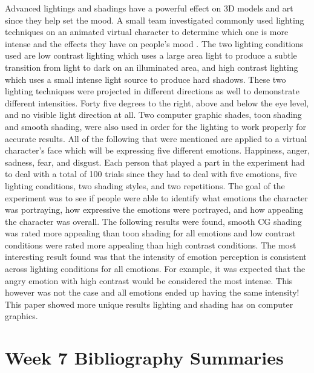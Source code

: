 \documentclass{article}
\begin{document}
Advanced lightings and shadings have a powerful effect on 3D models and art since they help set the mood. A small team investigated commonly used lighting techniques on an animated virtual character to determine which one is more intense and the effects they have on people's mood \cite{10.1145/2931002.2931015}. The two lighting conditions used are low contrast lighting which uses a large area light to produce a subtle transition from light to dark on an illuminated area, and high contrast lighting which uses a small intense light source to produce hard shadows. These two lighting techniques were projected in different directions as well to demonstrate different intensities. Forty five degrees to the right, above and below the eye level, and no visible light direction at all. Two computer graphic shades, toon shading and smooth shading, were also used in order for the lighting to work properly for accurate results. All of the following that were mentioned are applied to a virtual character’s face which will be expressing five different emotions. Happiness, anger, sadness, fear, and disgust. Each person that played a part in the experiment had to deal with a total of 100 trials since they had to deal with five emotions, five lighting conditions, two shading styles, and two repetitions. The goal of the experiment was to see if people were able to identify what emotions the character was portraying, how expressive the emotions were portrayed, and how appealing the character was overall. The following results were found, smooth CG shading was rated more appealing than toon shading for all emotions and low contrast conditions were rated more appealing than high contrast conditions. The most interesting result found was that the intensity of emotion perception is consistent across lighting conditions for all emotions. For example, it was expected that the angry emotion with high contrast would be considered the most intense. This however was not the case and all emotions ended up having the same intensity! This paper showed more unique results lighting and shading has on computer graphics.

\section{Week 7 Bibliography Summaries}
	
\end{document}
